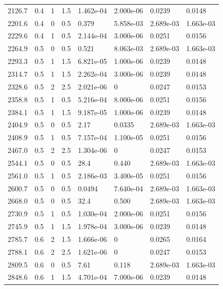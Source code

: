 \documentclass[preview]{standalone}
\begin{document}
{{{\begin{tabular}{L{1.2cm}C{1.2cm} C{0.3cm}C{0.5cm} C{1.4cm}C{1.4cm} C{1.4cm}C{1.4cm}}
  2126.7  &   0.4  & 1     & 1.5 &  1.462e-04  & 2.000e-06  & 0.0239 &  0.0148   \\ 
  2201.6  &   0.4  & 0     & 0.5 &  0.379  & 5.858e-03  & 2.689e-03 &  1.663e-03   \\ 
  2229.6  &   0.4  & 1     & 0.5 &  2.144e-04  & 3.000e-06  & 0.0251 &  0.0156   \\ 
  2264.9  &   0.5  & 0     & 0.5 &  0.521  & 8.063e-03  & 2.689e-03 &  1.663e-03   \\ 
  2293.3  &   0.5  & 1     & 1.5 &  6.821e-05  & 1.000e-06  & 0.0239 &  0.0148   \\ 
  2314.7  &   0.5  & 1     & 1.5 &  2.262e-04  & 3.000e-06  & 0.0239 &  0.0148   \\ 
  2328.6  &   0.5  & 2     & 2.5 &  2.021e-06  & 0  & 0.0247 &  0.0153   \\ 
  2358.8  &   0.5  & 1     & 0.5 &  5.216e-04  & 8.000e-06  & 0.0251 &  0.0156   \\ 
  2384.1  &   0.5  & 1     & 1.5 &  9.187e-05  & 1.000e-06  & 0.0239 &  0.0148   \\ 
  2404.9  &   0.5  & 0     & 0.5 &  2.17  & 0.0335  & 2.689e-03 &  1.663e-03   \\ 
  2408.9  &   0.5  & 1     & 0.5 &  7.157e-04  & 1.100e-05  & 0.0251 &  0.0156   \\ 
  2467.0  &   0.5  & 2     & 2.5 &  1.304e-06  & 0  & 0.0247 &  0.0153   \\ 
  2544.1  &   0.5  & 0     & 0.5 &  28.4  & 0.440  & 2.689e-03 &  1.663e-03   \\ 
  2561.0  &   0.5  & 1     & 0.5 &  2.186e-03  & 3.400e-05  & 0.0251 &  0.0156   \\ 
  2600.7  &   0.5  & 0     & 0.5 &  0.0494  & 7.640e-04  & 2.689e-03 &  1.663e-03   \\ 
  2668.0  &   0.5  & 0     & 0.5 &  32.4  & 0.500  & 2.689e-03 &  1.663e-03   \\ 
  2730.9  &   0.5  & 1     & 0.5 &  1.030e-04  & 2.000e-06  & 0.0251 &  0.0156   \\ 
  2745.9  &   0.5  & 1     & 1.5 &  1.978e-04  & 3.000e-06  & 0.0239 &  0.0148   \\ 
  2785.7  &   0.6  & 2     & 1.5 &  1.666e-06  & 0  & 0.0265 &  0.0164   \\ 
  2788.1  &   0.6  & 2     & 2.5 &  1.621e-06  & 0  & 0.0247 &  0.0153   \\ 
  2809.5  &   0.6  & 0     & 0.5 &  7.61  & 0.118  & 2.689e-03 &  1.663e-03   \\ 
  2848.6  &   0.6  & 1     & 1.5 &  4.701e-04  & 7.000e-06  & 0.0239 &  0.0148   \\ 

\end{tabular}}}}
\end{document}
